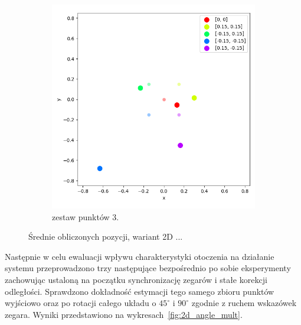 \begin{figure}[H]
    \ContinuedFloat\centering
    \begin{subfigure}{.5\textwidth}
        \centering
        \includegraphics[width=\linewidth]{pics/mult_lat_2d/positions_3_mean.png}
        \caption{zestaw punktów 3.}
        \label{pic:2d_3_mult}
    \end{subfigure}
    \caption[Wyniki eksperymentu dla wersji 2D]{Średnie obliczonych pozycji, wariant 2D ...}
    \label{fig:2d_mult}
\end{figure}

Następnie w celu ewaluacji wpływu charakterystyki otoczenia na działanie systemu przeprowadzono trzy następujące bezpośrednio po sobie eksperymenty zachowując ustaloną na początku synchronizację zegarów i stałe korekcji odległości. Sprawdzono dokładność estymacji tego samego zbioru punktów wyjściowo oraz po rotacji całego układu o $45^{\circ}$ i $90^{\circ}$ zgodnie z ruchem wskazówek zegara. Wyniki przedstawiono na wykresach~\ref{fig:2d_angle_mult}. 


